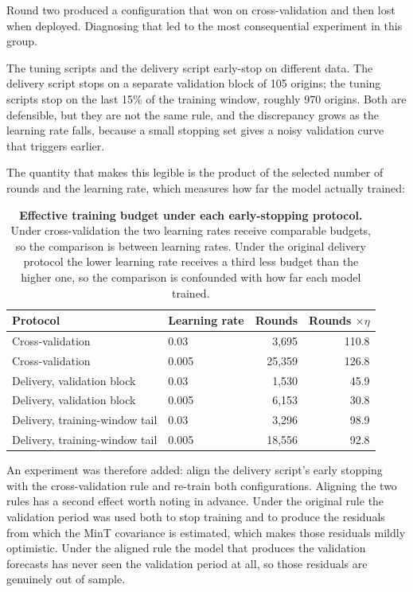 Round two produced a configuration that won on cross-validation and then lost when
deployed. Diagnosing that led to the most consequential experiment in this group.

The tuning scripts and the delivery script early-stop on different data. The delivery
script stops on a separate validation block of 105 origins; the tuning scripts stop on the
last 15\% of the training window, roughly 970 origins. Both are defensible, but they are
not the same rule, and the discrepancy grows as the learning rate falls, because a small
stopping set gives a noisy validation curve that triggers earlier.

The quantity that makes this legible is the product of the selected number of rounds and
the learning rate, which measures how far the model actually trained:

\begin{table}[htp]
\centering
\begin{tabular}{llrr}
\toprule
{\bf Protocol} & {\bf Learning rate} & {\bf Rounds} & {\bf Rounds $\times \eta$} \\
\midrule
Cross-validation & 0.03 & 3,695 & 110.8 \\
Cross-validation & 0.005 & 25,359 & 126.8 \\
\midrule
Delivery, validation block & 0.03 & 1,530 & 45.9 \\
Delivery, validation block & 0.005 & 6,153 & 30.8 \\
\midrule
Delivery, training-window tail & 0.03 & 3,296 & 98.9 \\
Delivery, training-window tail & 0.005 & 18,556 & 92.8 \\
\bottomrule
\end{tabular}
\caption[Effective training budget]{\textbf{Effective training budget under each
early-stopping protocol.} Under cross-validation the two learning rates receive
comparable budgets, so the comparison is between learning rates. Under the original
delivery protocol the lower learning rate receives a third less budget than the higher
one, so the comparison is confounded with how far each model trained.}
\label{tab:budget}
\end{table}

An experiment was therefore added: align the delivery script's early stopping with the
cross-validation rule and re-train both configurations. Aligning the two rules has a
second effect worth noting in advance. Under the original rule the validation period was
used both to stop training and to produce the residuals from which the MinT covariance is
estimated, which makes those residuals mildly optimistic. Under the aligned rule the model
that produces the validation forecasts has never seen the validation period at all, so
those residuals are genuinely out of sample.

